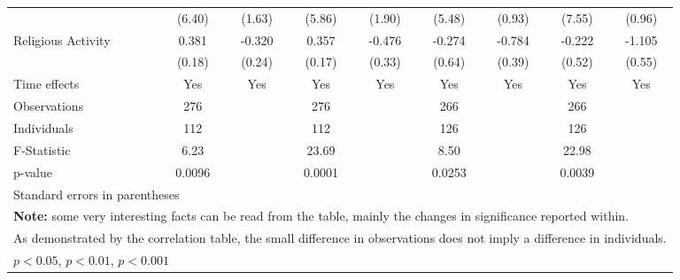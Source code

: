 \begin{table}[htbp]
\begin{tabular}{l*{8}{c}}
                              &(6.40)         &(1.63)         &(5.86)         &(1.90)         &(5.48)         &(0.93)         &(7.55)         &(0.96)         \\
\hspace{0.25cm} Religious Activity&0.381\sym{*}  &-0.320         &0.357\sym{*}  &-0.476         &-0.274         &-0.784         &-0.222         &-1.105         \\
                              &(0.18)         &(0.24)         &(0.17)         &(0.33)         &(0.64)         &(0.39)         &(0.52)         &(0.55)         \\
Time effects                  &  Yes         &  Yes         &  Yes         &  Yes         &  Yes         &  Yes         &  Yes         &  Yes         \\
\midrule
Observations                  &  276         &              &  276         &              &  266         &              &  266         &              \\
Individuals                   &  112         &              &  112         &              &  126         &              &  126         &              \\
F-Statistic                   & 6.23         &              &23.69         &              & 8.50         &              &22.98         &              \\
p-value                       &0.0096         &              &0.0001         &              &0.0253         &              &0.0039         &              \\
\bottomrule
\multicolumn{9}{l}{\footnotesize Standard errors in parentheses}\\
\multicolumn{9}{l}{\footnotesize \textbf{Note:} some very interesting facts can be read from the table, mainly the changes in significance reported within.}\\
\multicolumn{9}{l}{\footnotesize As demonstrated by the correlation table, the small difference in observations does not imply a difference in individuals.}\\
\multicolumn{9}{l}{\footnotesize \sym{*} \(p<0.05\), \sym{**} \(p<0.01\), \sym{***} \(p<0.001\)}\\
\end{tabular}
\end{table}
